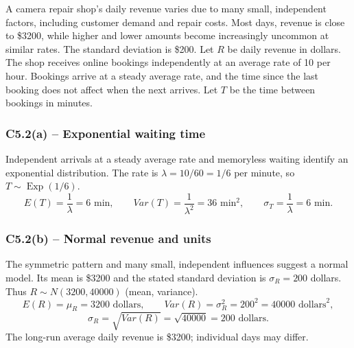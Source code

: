 {
A camera repair shop's daily revenue varies due to many small, independent
factors, including customer demand and repair costs. Most days, revenue
is close to \$3200, while higher and lower amounts become increasingly
uncommon at similar rates. The standard deviation is \$200.
Let $R$ be daily revenue in dollars.
The shop receives online bookings independently at an average rate of
10 per hour. Bookings arrive at a steady average rate, and the time since
the last booking does not affect when the next arrives.
Let $T$ be the time between bookings in minutes.
\label{sol:c5-2a}
\subsubsection*{C5.2(a) -- Exponential waiting time }
Independent arrivals at a steady average rate and memoryless waiting identify
an exponential distribution. The rate is $\lambda=10/60=1/6$ per minute,
so $T\sim\operatorname{Exp}(1/6)$.
\[
E(T)=\frac{1}{\lambda}=6\text{ min},\qquad
Var(T)=\frac{1}{\lambda^2}=36\text{ min}^2,\qquad
\sigma_T=\frac{1}{\lambda}=6\text{ min}.
\]
\label{sol:c5-2b}
\subsubsection*{C5.2(b) -- Normal revenue and units }
The symmetric pattern and many small, independent influences suggest a normal
model. Its mean is \$3200 and the stated standard deviation is
$\sigma_R=200$ dollars.
Thus $R\sim N(3200,40000)$ (mean, variance).
\[
E(R)=\mu_R=3200\text{ dollars},\qquad
Var(R)=\sigma_R^2=200^2=40000\text{ dollars}^2,
\]
\[
\sigma_R=\sqrt{Var(R)}=\sqrt{40000}=200\text{ dollars}.
\]
The long-run average daily revenue is \$3200; individual days may differ.
\secInicio[sec:c5-2]

}

